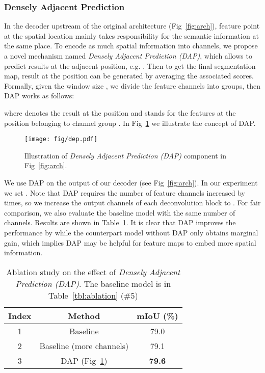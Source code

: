 \documentclass[runningheads]{llncs}
\begin{document}
\subsubsection{Densely Adjacent Prediction}

In the decoder upstream of the original architecture (Fig~\ref{fig:arch}), feature point at the spatial location  mainly takes responsibility for the semantic information at the same place. To encode as much spatial information into channels, we propose a novel mechanism named \emph{Densely Adjacent Prediction (DAP)}, which allows to predict results at the adjacent position, e.g. . Then to get the final segmentation map, result at the position  can be generated by averaging the associated scores. Formally, given the window size , we divide the feature channels into  groups, then {DAP} works as follows:


where  denotes the result at the position  and  stands for the features at the position  belonging to channel group . In Fig~\ref{fig:dap} we illustrate the concept of DAP.
\begin{figure}[htbp]
	\centering
	\texttt{[image: fig/dep.pdf]}
	\caption{Illustration of \emph{Densely Adjacent Prediction (DAP)} component in Fig~\ref{fig:arch}.}
	\label{fig:dap}
\end{figure}


We use DAP on the output of our decoder (see Fig~\ref{fig:arch}). In our experiment we set . Note that DAP requires the number of feature channels increased by  times, so we increase the output channels of each deconvolution block to  . For fair comparison, we also evaluate the baseline model with the same number of channels. Results are shown in Table~\ref{tbl:dap}. It is clear that DAP improves the performance by  while the counterpart model without DAP only obtains marginal gain, which implies DAP may be helpful for feature maps to embed more spatial information.

\begin{table}[h]

\begin{center}
\begin{tabular}{c|c|c}
\hline
Index & Method  & mIoU (\%) \\
\hline 1 & Baseline & 79.0 \\
\hline
2 & Baseline (more channels) & 79.1\\
\hline
3 & DAP (Fig~\ref{fig:dap})  & \textbf{79.6}\\
\hline
\end{tabular}
\end{center}
\caption{Ablation study on the effect of \emph{Densely Adjacent Prediction (DAP)}. The baseline model is in Table~\ref{tbl:ablation} (\#5)}

\label{tbl:dap}
\end{table}
\end{document}
